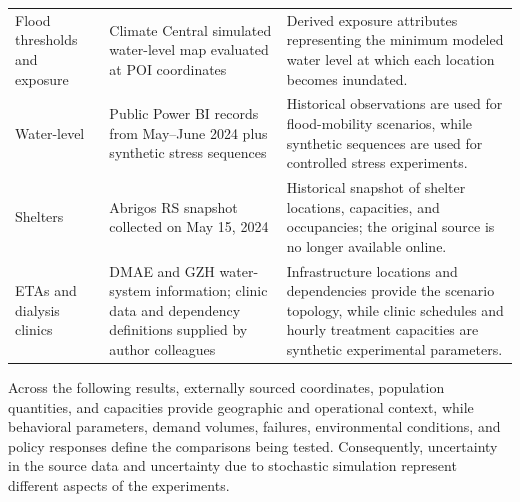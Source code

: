 \begin{table}[ht]
\begin{tabularx}{\linewidth}{@{}p{3.5cm}p{6.2cm}X@{}}
Flood thresholds and exposure
& Climate Central simulated water-level map evaluated at POI coordinates
& Derived exposure attributes representing the minimum modeled water level at which each location becomes inundated.\\

Water-level
& Public Power BI records from May--June 2024 plus synthetic stress sequences
& Historical observations are used for flood-mobility scenarios, while synthetic sequences are used for controlled stress experiments.\\

Shelters
& Abrigos RS snapshot collected on May 15, 2024
& Historical snapshot of shelter locations, capacities, and occupancies; the original source is no longer available online. \\

ETAs and dialysis clinics
& DMAE and GZH water-system information; clinic data and dependency definitions supplied by author colleagues
& Infrastructure locations and dependencies provide the scenario topology, while clinic schedules and hourly treatment capacities are synthetic experimental parameters. \\
\bottomrule
\end{tabularx}
\end{table}

Across the following results, externally sourced coordinates, population quantities, and capacities provide geographic and operational context, while behavioral parameters, demand volumes, failures, environmental conditions, and policy responses define the comparisons being tested. Consequently, uncertainty in the source data and uncertainty due to stochastic simulation represent different aspects of the experiments.
